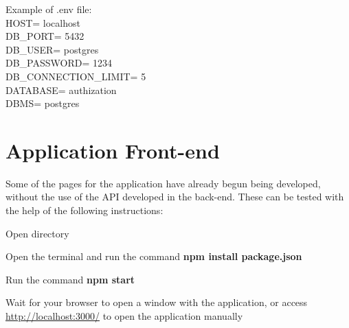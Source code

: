 \documentclass{article}
\begin{document}
\newpage
Example of .env file:\\
\newline
HOST= localhost \\
DB\_PORT= 5432 \\
DB\_USER= postgres \\
DB\_PASSWORD= 1234 \\
DB\_CONNECTION\_LIMIT= 5 \\
DATABASE= authization \\
DBMS= postgres \\

\section{Application Front-end}
Some of the pages for the application have already begun being developed, without the use of the API developed in the back-end. These can be tested with the help of the following instructions:

\begin{center}
\begin{steps}
  \item Open directory 
  \item Open the terminal and run the command \textbf{npm install package.json}
  \item Run the command \textbf{npm start}
  \item Wait for your browser to open a window with the application, or access \url{http://localhost:3000/} to open the application manually
 
\end{steps}
\end{center}
\end{document}
